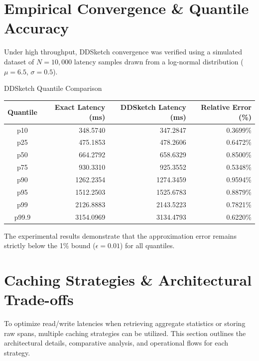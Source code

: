 \documentclass[11pt,a4paper]{article}
\theoremstyle{definition}
\begin{document}
\section{Empirical Convergence \& Quantile Accuracy}\label{sec:empirical}
Under high throughput, DDSketch convergence was verified using a simulated dataset of $N = 10,000$ latency samples drawn from a log-normal distribution ($\mu=6.5$, $\sigma=0.5$). 

\begin{infobox}{DDSketch Quantile Comparison}
\centering
\begin{tabular}{crrr}
\toprule
\textbf{Quantile} & \textbf{Exact Latency (ms)} & \textbf{DDSketch Latency (ms)} & \textbf{Relative Error (\%)} \\
\midrule
p10   & 348.5740  & 347.2847  & 0.3699\% \\
p25   & 475.1853  & 478.2606  & 0.6472\% \\
p50   & 664.2792  & 658.6329  & 0.8500\% \\
p75   & 930.3310  & 925.3552  & 0.5348\% \\
p90   & 1262.2354 & 1274.3459 & 0.9594\% \\
p95   & 1512.2503 & 1525.6783 & 0.8879\% \\
p99   & 2126.8883 & 2143.5223 & 0.7821\% \\
p99.9 & 3154.0969 & 3134.4793 & 0.6220\% \\
\bottomrule
\end{tabular}
\end{infobox}

The experimental results demonstrate that the approximation error remains strictly below the 1\% bound ($\epsilon = 0.01$) for all quantiles.



\section{Caching Strategies \& Architectural Trade-offs}\label{sec:caching-strategies}
To optimize read/write latencies when retrieving aggregate statistics or storing raw spans, multiple caching strategies can be utilized. This section outlines the architectural details, comparative analysis, and operational flows for each strategy.
\end{document}
